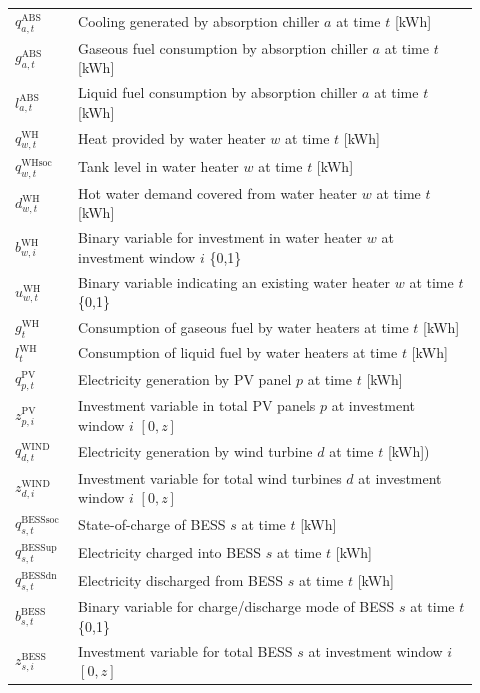 \documentclass[11pt]{article}
\begin{document}
\begin{center}
\begin{tabular}{p{0.12\linewidth}p{0.8\linewidth}}
\(q^\text{ABS}_{a,t}\) & Cooling generated by absorption chiller \(a\) at time \(t\) [kWh] \\
\(g^\text{ABS}_{a,t}\) & Gaseous fuel consumption by absorption chiller \(a\) at time \(t\) [kWh] \\
\(l^\text{ABS}_{a,t}\) & Liquid fuel consumption by absorption chiller \(a\) at time \(t\) [kWh] \\
\(q^\text{WH}_{w,t}\) & Heat provided by water heater \(w\) at time \(t\) [kWh] \\
\(q^\text{WHsoc}_{w,t}\) & Tank level in water heater \(w\) at time \(t\) [kWh] \\
\(d^\text{WH}_{w,t}\) & Hot water demand covered from water heater \(w\) at time \(t\) [kWh] \\
\(b^\text{WH}_{w,i}\) & Binary variable for investment in water heater \(w\) at investment window \(i\) \{0,1\} \\
\(u^\text{WH}_{w,t}\) & Binary variable indicating an existing water heater \(w\) at time \(t\) \{0,1\} \\
\(g^\text{WH}_{t}\) & Consumption of gaseous fuel by water heaters at time \(t\) [kWh] \\
\(l^\text{WH}_{t}\) & Consumption of liquid fuel by water heaters at time \(t\) [kWh] \\
\(q^\text{PV}_{p,t}\) & Electricity generation by PV panel \(p\) at time \(t\) [kWh] \\
\(z^\text{PV}_{p,i}\) & Investment variable in total PV panels \(p\) at investment window \(i\) \([0, z]\) \\
\(q^\text{WIND}_{d,t}\) & Electricity generation by wind turbine \(d\) at time \(t\) [kWh]) \\
\(z^\text{WIND}_{d,i}\) & Investment variable for total wind turbines \(d\) at investment window \(i\) \([0, z]\) \\
\(q^\text{BESSsoc}_{s,t}\) & State-of-charge of BESS \(s\) at time \(t\) [kWh] \\
\(q^\text{BESSup}_{s,t}\) & Electricity charged into BESS \(s\) at time \(t\) [kWh] \\
\(q^\text{BESSdn}_{s,t}\) & Electricity discharged from BESS \(s\) at time \(t\) [kWh] \\
\(b^\text{BESS}_{s,t}\) & Binary variable for charge/discharge mode of BESS \(s\) at time \(t\) \{0,1\} \\
\(z^\text{BESS}_{s,i}\) & Investment variable for total BESS \(s\) at investment window \(i\) \([0, z]\) \\

\end{tabular}
\end{center}
\end{document}
